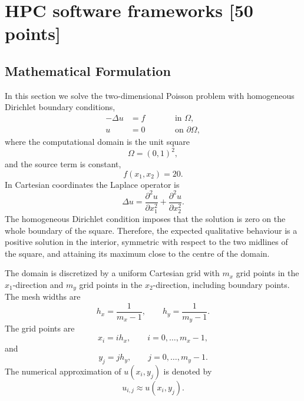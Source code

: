 \documentclass[unicode,10pt,a4paper,oneside,numbers=endperiod,openany]{scrartcl}
\begin{document}
\newpage
\section{HPC software frameworks [50 points]}

\subsection{Mathematical Formulation}

In this section we solve the two-dimensional Poisson problem with homogeneous
Dirichlet boundary conditions,
\begin{equation*}
\begin{aligned}
    -\Delta u &= f \qquad &&\text{in } \Omega,\\
    u &= 0 \qquad &&\text{on } \partial \Omega,
\end{aligned}
\label{eq:poisson_continuous}
\end{equation*}
where the computational domain is the unit square
\begin{equation*}
    \Omega = (0,1)^2,
\end{equation*}
and the source term is constant,
\begin{equation*}
    f(x_1,x_2) = 20.
\end{equation*}
In Cartesian coordinates the Laplace operator is
\begin{equation*}
    \Delta u =
    \frac{\partial^2 u}{\partial x_1^2}
    +
    \frac{\partial^2 u}{\partial x_2^2}.
\end{equation*}
The homogeneous Dirichlet condition imposes that the solution is zero on the
whole boundary of the square. Therefore, the expected qualitative behaviour is
a positive solution in the interior, symmetric with respect to the two midlines
of the square, and attaining its maximum close to the centre of the domain.

The domain is discretized by a uniform Cartesian grid with \(m_x\) grid points
in the \(x_1\)-direction and \(m_y\) grid points in the \(x_2\)-direction,
including boundary points. The mesh widths are
\begin{equation*}
    h_x = \frac{1}{m_x-1},
    \qquad
    h_y = \frac{1}{m_y-1}.
\end{equation*}
The grid points are
\begin{equation*}
    x_i = i h_x, \qquad i=0,\ldots,m_x-1,
\end{equation*}
and
\begin{equation*}
    y_j = j h_y, \qquad j=0,\ldots,m_y-1.
\end{equation*}
The numerical approximation of \(u(x_i,y_j)\) is denoted by
\begin{equation*}
    u_{i,j} \approx u(x_i,y_j).
\end{equation*}
\end{document}
